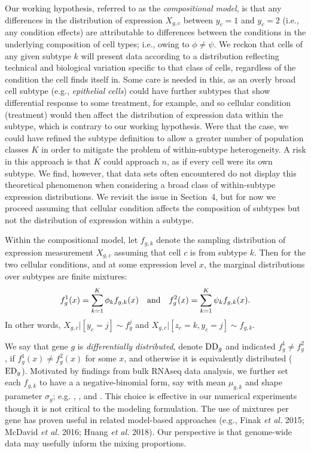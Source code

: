 \documentclass[aoas,preprint]{imsart}
\begin{document}
Our working hypothesis, referred to as the {\em compositional model},  is that any differences in the distribution of expression $X_{g,c}$ 
between $y_c=1$ and $y_c=2$ (i.e., any condition effects) are attributable 
to differences between the conditions 
in the underlying composition of cell types; i.e.,
owing to $\phi \neq \psi$.  We reckon that cells of any given subtype $k$ will
present data according to a distribution reflecting technical 
and biological variation specific to that class of cells, regardless of the 
condition the cell finds itself in.   Some care is needed in this, as an overly
broad cell subtype (e.g., {\em epithelial cells}) could have
further subtypes that show differential response to some treatment, for example,
and so cellular condition (treatment) would then affect the distribution of 
expression data within the subtype, which is contrary to our working hypothesis.
Were that the case,  we could have refined the subtype definition to allow a greater
number of population classes $K$ in order to mitigate the problem of within-subtype 
heterogeneity. A  risk in this approach is that $K$ could approach $n$, as if  
every cell were  its own subtype.  We find, however,
that data sets often encountered do not display this theoretical phenomenon
when considering a broad class of within-subtype expression distributions.
We revisit the issue in Section~4, but for now we proceed assuming 
that cellular condition affects the composition of subtypes but not the distribution of expression
within a subtype.

Within the compositional model, let $f_{g,k}$ denote the sampling distribution
of expression measurement $X_{g,c}$ assuming that cell $c$ is from subtype $k$.
Then for the two cellular conditions, and at some expression level $x$, 
the marginal distributions over subtypes are finite mixtures:
\begin{eqnarray*}
f_g^1(x) = \sum_{k=1}^K \phi_k f_{g,k} (x) \quad {\mbox {\rm and}} \quad
f_g^2(x) = \sum_{k=1}^K \psi_k f_{g,k} (x).
\end{eqnarray*}
In other words,  $X_{g,c} |[ y_c=j]  \sim f_g^j$  and $X_{g,c} |[ z_c=k, y_c=j] \sim f_{g,k}$.

We say that gene $g$ is {\em differentially distributed}, denote ${\rm DD}_g$ and indicated
$f_g^1 \neq f_g^2$,
if $f_g^1(x) \neq f_g^2(x)$ for some $x$, and otherwise it is equivalently distributed
(${\rm ED}_g$). Motivated by findings from bulk RNAseq data analysis, we further
set each $f_{g,k}$ to have a a negative-binomial form, say with mean $\mu_{g,k}$
and shape parameter $\sigma_g$; e.g. \cite{ref:Leng}, \cite{DES}, and \cite{ref:Des}. 
This choice is effective in our numerical experiments though it is 
not critical to the modeling formulation.  The use of mixtures per gene has proven
useful in related model-based approaches (e.g., Finak {\em et al.} 2015; McDavid {\em et al.} 2016;
Huang {\em et al.} 2018).
Our perspective is that  genome-wide data may usefully inform the  mixing proportions.
\end{document}

